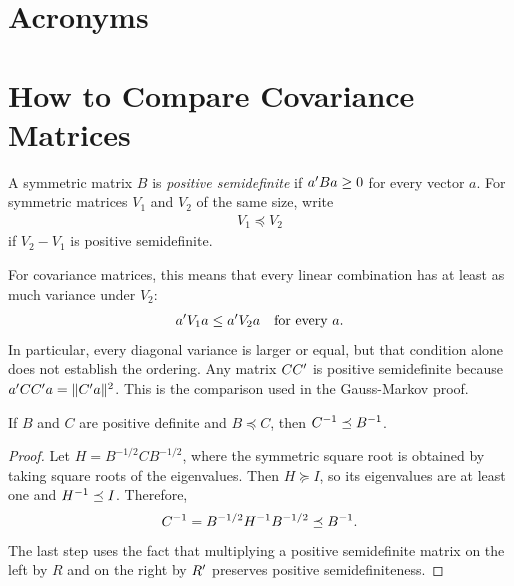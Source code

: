 \documentclass[a4paper,12pt]{article}
\begin{document}
\vfill
\section*{Acronyms}
\printglossaries

\clearpage
\appendix
\section{How to Compare Covariance Matrices}\label{sec-covariance-ordering}

\begin{definition}
	A symmetric matrix $B$ is \emph{positive semidefinite} if $a^{\prime} Ba\ge0$ for every vector $a$.
	For symmetric matrices $V_1$ and $V_2$ of the same size, write
	\begin{align*}
		V_1\preceq V_2
	\end{align*}
	if $V_2-V_1$ is positive semidefinite.
\end{definition}

\begin{remark}
	For covariance matrices, this means that every linear combination has at least as much variance under $V_2$:
	\begin{align*}
		a^{\prime} V_1a\le a^{\prime} V_2a\quad\text{for every }a.
	\end{align*}
	In particular, every diagonal variance is larger or equal, but that condition alone does not establish the ordering.
	Any matrix $CC^{\prime}$ is positive semidefinite because $a^{\prime} CC^{\prime} a=\|C^{\prime} a\|^2$.
	This is the comparison used in the Gauss-Markov proof.
\end{remark}

\begin{proposition}
	If $B$ and $C$ are positive definite and $B\preceq C$, then $C^{-1}\preceq B^{-1}$.
\end{proposition}
\begin{proof}
	Let $H=B^{-1/2}CB^{-1/2}$, where the symmetric square root is obtained by taking square roots of the eigenvalues.
	Then $H\succeq I$, so its eigenvalues are at least one and $H^{-1}\preceq I$.
	Therefore,
	\begin{align*}
		C^{-1}=B^{-1/2}H^{-1} B^{-1/2}\preceq B^{-1}.
	\end{align*}
	The last step uses the fact that multiplying a positive semidefinite matrix on the left by $R$ and on the right by $R^{\prime}$ preserves positive semidefiniteness.
\end{proof}
\end{document}
